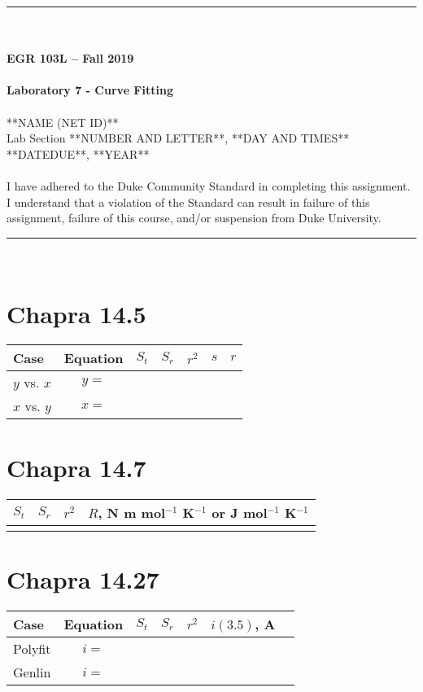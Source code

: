 \documentclass{article}
\begin{document}
\begin{center}
\rule{6.5in}{0.5mm}\\~\\
\textbf{\large EGR 103L -- Fall 2019}\\~\\
\textbf{\huge Laboratory 7 - Curve Fitting}\\~\\
**NAME (NET ID)**\\
Lab Section **NUMBER AND LETTER**, **DAY AND TIMES**\\
**DATEDUE**, **YEAR**\\~\\
{\small I have adhered to the Duke Community Standard in completing
  this assignment.  I understand that a violation of the Standard can
  result in failure of this assignment, failure of this course, and/or
  suspension from Duke University.} 
\rule{6.5in}{0.5mm}\\
\end{center}
\tableofcontents
\listoffigures
\renewcommand{\arraystretch}{1.5}
\clearpage

\section{Chapra 14.5}
\begin{center}
\begin{tabular}{l|c|c|c|c|c|c}
Case & Equation & $S_t$ & $S_r$ & $r^2$ & $s$ & $r$ \\ \hline
$y$ vs. $x$ & $y=$ & & & & & \\ 
$x$ vs. $y$ & $x=$ & & & & & 
\end{tabular}
\end{center}

\section{Chapra 14.7}
\begin{center}
\begin{tabular}{c|c|c|c}
$S_t$ & $S_r$ & $r^2$ & 
$R$, N m mol$^{-1}$ K$^{-1}$ or J  mol$^{-1}$ K$^{-1}$\\ \hline
 &  &  &  
\end{tabular}
\end{center}

\section{Chapra 14.27}
\begin{center}
\begin{tabular}{l|c|c|c|c|c|c}
Case & Equation & $S_t$ & $S_r$ & $r^2$ & $i(3.5)$, A\\ \hline
Polyfit & $i=$ & & & & & \\ 
Genlin  & $i=$ & & & & & 
\end{tabular}
\end{center}
\end{document}
